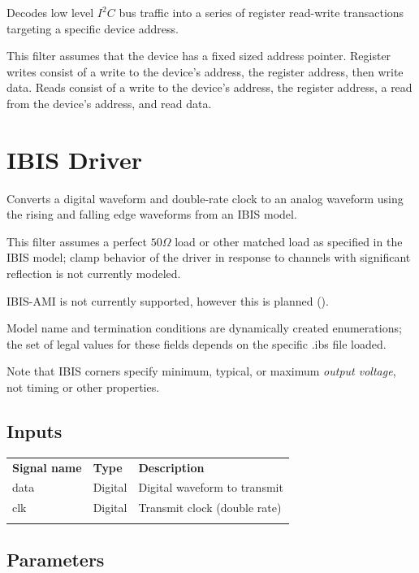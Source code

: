 Decodes low level $I^2C$ bus traffic into a series of register read-write transactions targeting a specific device
address.

This filter assumes that the device has a fixed sized address pointer. Register writes consist of a write to the
device's address, the register address, then write data. Reads consist of a write to the device's address, the register
address, a read from the device's address, and read data.

\pagebreak
\section{IBIS Driver}
\label{filter:ibisdriver}

Converts a digital waveform and double-rate clock to an analog waveform using the rising and falling edge waveforms
from an IBIS model.

This filter assumes a perfect $50\Omega$ load or other matched load as specified in the IBIS model; clamp behavior of
the driver in response to channels with significant reflection is not currently modeled.

IBIS-AMI is not currently supported, however this is planned ().

Model name and termination conditions are dynamically created enumerations; the set of legal values for these fields
depends on the specific .ibs file loaded.

Note that IBIS corners specify minimum, typical, or maximum \emph{output voltage}, not timing or other properties.

\subsection{Inputs}

\begin{tabularx}{16cm}{llX}
\thickhline
\textbf{Signal name} & \textbf{Type} & \textbf{Description} \\
\thickhline
data & Digital & Digital waveform to transmit\\
\thinhline
clk & Digital & Transmit clock (double rate)\\
\thickhline
\end{tabularx}

\subsection{Parameters}

